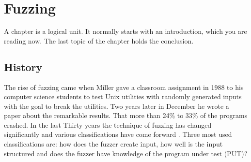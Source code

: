 \chapter{Fuzzing}
\label{cha:1}
A chapter is a logical unit. It normally starts with an introduction, which
you are reading now. The last topic of the chapter holds the conclusion.

%


\section{History} 
The rise of fuzzing came when Miller gave a classroom assignment \cite{21FuzzingAssignment} in 1988 to his computer science students to test Unix utilities with randomly generated inputs with the goal to break the utilities. Two years later in December he wrote a paper \cite{4originalFuzzingUnixUtils} about the remarkable results. That more than 24\% to 33\% of the programs crashed.
In the last Thirty years the technique of fuzzing has changed significantly and various classifications have come forward \cite{12Fuzzingasurvey} \cite{13manes2019survey}. Three most used classifications are: 
how does the fuzzer create input, how well is the input structured and does the fuzzer have knowledge of the program under test (PUT)?




